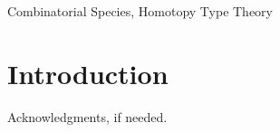 \documentclass[preprint,authoryear]{sigplanconf}
\begin{document}


\keywords
Combinatorial Species, Homotopy Type Theory

\section{Introduction}


\acks

Acknowledgments, if needed.







\end{document}
